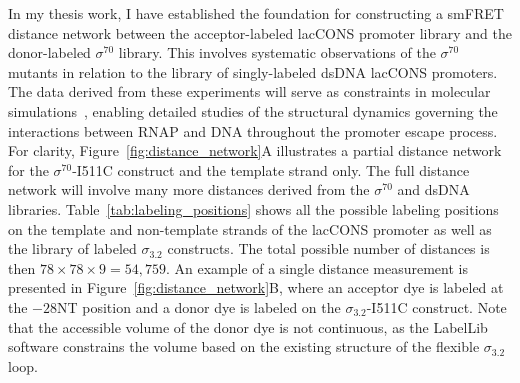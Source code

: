 In my thesis work, I have established the foundation for constructing a \ac{smFRET} distance network between the acceptor-labeled \ac{lacCONS} promoter library and the donor-labeled $\sigma^{70}$ library. 
This involves systematic observations of the $\sigma^{70}$ mutants in relation to the library of singly-labeled \ac{dsDNA} \ac{lacCONS} promoters. 
The data derived from these experiments will serve as constraints in molecular simulations~\cite{dimura_COSB_2016}, enabling detailed studies of the structural dynamics governing the interactions between \ac{RNAP} and DNA throughout the promoter escape process.
For clarity, Figure~\ref{fig:distance_network}A illustrates a partial distance network for the $\sigma^{70}$-I511C construct and the template strand only. 
The full distance network will involve many more distances derived from the $\sigma^{70}$ and \ac{dsDNA} libraries.
Table~\ref{tab:labeling_positions} shows all the possible labeling positions on the template and non-template strands of the \ac{lacCONS} promoter as well as the library of labeled $\sigma_{3.2}$ constructs.
The total possible number of distances is then $78 \times 78 \times 9 = 54,759$.
An example of a single distance measurement is presented in Figure~\ref{fig:distance_network}B, where an acceptor dye is labeled at the $-28$NT position and a donor dye is labeled on the $\sigma_{3.2}$-I511C construct. 
Note that the accessible volume of the donor dye is not continuous, as the LabelLib software constrains the volume based on the existing structure of the flexible $\sigma_{3.2}$ loop. 

